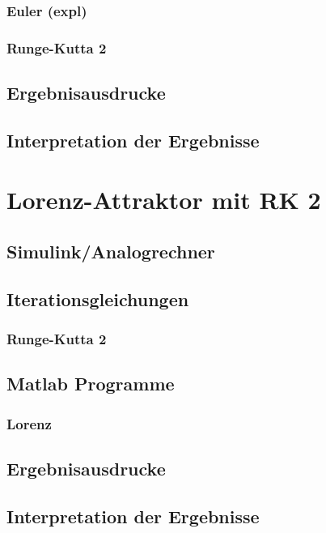 \documentclass[10pt]{scrartcl}
\begin{document}
		\subsubsection{Euler (expl)}	
	
		\subsubsection{Runge-Kutta 2}	
		
	\subsection{Ergebnisausdrucke}	
		
	\subsection{Interpretation der Ergebnisse}	
	
\section{Lorenz-Attraktor mit RK 2}	
	\subsection{Simulink/Analogrechner}
	
	\subsection{Iterationsgleichungen}
		\subsubsection{Runge-Kutta 2}

	\subsection{Matlab Programme}
		\subsubsection{Lorenz}			

	\subsection{Ergebnisausdrucke}	
		
	\subsection{Interpretation der Ergebnisse}				
\end{document}
